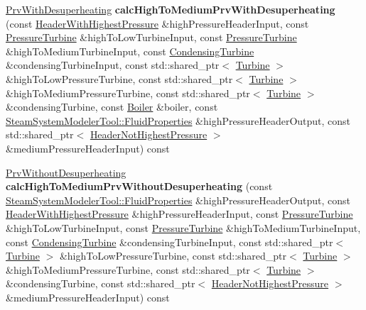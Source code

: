 \begin{DoxyCompactItemize}
\item 
\mbox{\label{class_prv_calculator_a07b64cdc95d9a7fd980bdd586654ca22}} 
\hyperlink{class_prv_with_desuperheating}{Prv\+With\+Desuperheating} {\bfseries calc\+High\+To\+Medium\+Prv\+With\+Desuperheating} (const \hyperlink{class_header_with_highest_pressure}{Header\+With\+Highest\+Pressure} \&high\+Pressure\+Header\+Input, const \hyperlink{class_pressure_turbine}{Pressure\+Turbine} \&high\+To\+Low\+Turbine\+Input, const \hyperlink{class_pressure_turbine}{Pressure\+Turbine} \&high\+To\+Medium\+Turbine\+Input, const \hyperlink{class_condensing_turbine}{Condensing\+Turbine} \&condensing\+Turbine\+Input, const std\+::shared\+\_\+ptr$<$ \hyperlink{class_turbine}{Turbine} $>$ \&high\+To\+Low\+Pressure\+Turbine, const std\+::shared\+\_\+ptr$<$ \hyperlink{class_turbine}{Turbine} $>$ \&high\+To\+Medium\+Pressure\+Turbine, const std\+::shared\+\_\+ptr$<$ \hyperlink{class_turbine}{Turbine} $>$ \&condensing\+Turbine, const \hyperlink{class_boiler}{Boiler} \&boiler, const \hyperlink{struct_steam_system_modeler_tool_1_1_fluid_properties}{Steam\+System\+Modeler\+Tool\+::\+Fluid\+Properties} \&high\+Pressure\+Header\+Output, const std\+::shared\+\_\+ptr$<$ \hyperlink{class_header_not_highest_pressure}{Header\+Not\+Highest\+Pressure} $>$ \&medium\+Pressure\+Header\+Input) const
\item 
\mbox{\label{class_prv_calculator_a42c579ff96593bab8109610d557718c0}} 
\hyperlink{class_prv_without_desuperheating}{Prv\+Without\+Desuperheating} {\bfseries calc\+High\+To\+Medium\+Prv\+Without\+Desuperheating} (const \hyperlink{struct_steam_system_modeler_tool_1_1_fluid_properties}{Steam\+System\+Modeler\+Tool\+::\+Fluid\+Properties} \&high\+Pressure\+Header\+Output, const \hyperlink{class_header_with_highest_pressure}{Header\+With\+Highest\+Pressure} \&high\+Pressure\+Header\+Input, const \hyperlink{class_pressure_turbine}{Pressure\+Turbine} \&high\+To\+Low\+Turbine\+Input, const \hyperlink{class_pressure_turbine}{Pressure\+Turbine} \&high\+To\+Medium\+Turbine\+Input, const \hyperlink{class_condensing_turbine}{Condensing\+Turbine} \&condensing\+Turbine\+Input, const std\+::shared\+\_\+ptr$<$ \hyperlink{class_turbine}{Turbine} $>$ \&high\+To\+Low\+Pressure\+Turbine, const std\+::shared\+\_\+ptr$<$ \hyperlink{class_turbine}{Turbine} $>$ \&high\+To\+Medium\+Pressure\+Turbine, const std\+::shared\+\_\+ptr$<$ \hyperlink{class_turbine}{Turbine} $>$ \&condensing\+Turbine, const std\+::shared\+\_\+ptr$<$ \hyperlink{class_header_not_highest_pressure}{Header\+Not\+Highest\+Pressure} $>$ \&medium\+Pressure\+Header\+Input) const

\end{DoxyCompactItemize}
